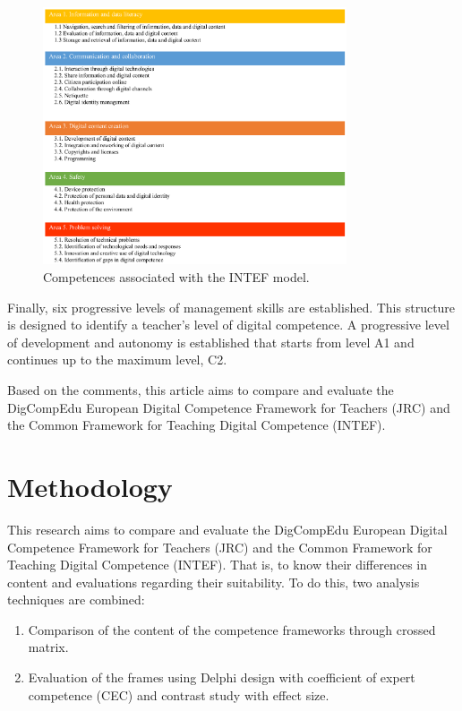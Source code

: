 \documentclass{textolivre}
\begin{document}
\begin{figure}[htbp]
 \centering
 \includegraphics[width=0.8\textwidth]{fig04.png}
 \caption{Competences associated with the INTEF model.}
 \label{fig04}
\end{figure}


Finally, six progressive levels of management skills are established. This
structure is designed to identify a teacher's level of digital competence. A
progressive level of development and autonomy is established that starts from
level A1 and continues up to the maximum level, C2.

Based on the comments, this article aims to compare and evaluate the DigCompEdu
European Digital Competence Framework for Teachers (JRC) and the Common
Framework for Teaching Digital Competence (INTEF).


\section{Methodology}\label{sec-meth}
This research aims to compare and evaluate the DigCompEdu European Digital
Competence Framework for Teachers (JRC) and the Common Framework for Teaching
Digital Competence (INTEF). That is, to know their differences in content and
evaluations regarding their suitability. To do this, two analysis techniques
are combined:

\begin{enumerate}
\item Comparison of the content of the competence frameworks through crossed
matrix.
\item Evaluation of the frames using Delphi design with coefficient of expert
competence (CEC) and contrast study with effect size.
\end{enumerate}
\end{document}
